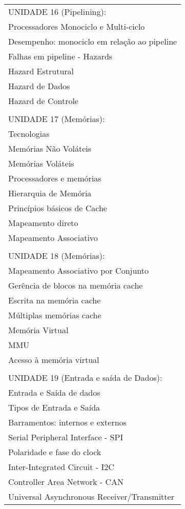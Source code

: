 \documentclass[12pt]{article}
\begin{document}
\begin{longtable}{|L{1.025\textwidth}|}
\\
UNIDADE 16 (Pipelining):\\
      Processadores Monociclo e Multi-ciclo\\
      Desempenho: monociclo em relação ao pipeline\\
      Falhas em pipeline - Hazards \\
      Hazard Estrutural \\
      Hazard de Dados\\
      Hazard de Controle\\ 
\\
UNIDADE 17 (Memórias):\\
      Tecnologias \\
      Memórias Não Voláteis\\
      Memórias Voláteis \\
      Processadores e memórias\\ 
      Hierarquia de Memória\\
      Princípios básicos de Cache\\ 
      Mapeamento direto \\
      Mapeamento Associativo \\
      \\
UNIDADE 18 (Memórias):\\
      Mapeamento Associativo por Conjunto\\
      Gerência de blocos na memória cache\\
      Escrita na memória cache \\
      Múltiplas memórias cache \\
      Memória Virtual \\
      MMU \\
       Acesso à memória virtual\\
\\ 
UNIDADE 19 (Entrada e saída de Dados):\\
      Entrada e Saída de dados \\
      Tipos de Entrada e Saída \\
      Barramentos: internos e externos\\ 
      Serial Peripheral Interface - SPI \\
      Polaridade e fase do clock\\
      Inter-Integrated Circuit - I2C\\ 
      Controller Area Network - CAN \\
      Universal Asynchronous Receiver/Transmitter\\

\end{longtable}
\end{document}
